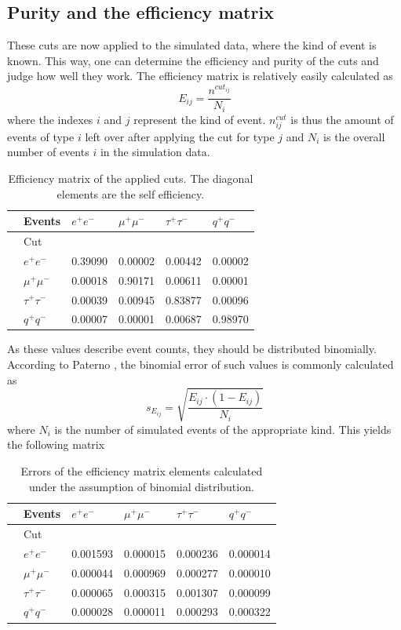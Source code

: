 \subsection{Purity and the efficiency matrix}
These cuts are now applied to the simulated data, where the kind of event is known. This way, one can determine the efficiency and purity of the cuts and judge how well they work. 
The efficiency matrix is relatively easily calculated as
\begin{equation}
E_{ij}=\frac{n^{cut_{ij}}}{N_i}
\end{equation}
where the indexes $i$ and $j$ represent the kind of event. $n^{cut}_{ij}$ is thus the amount of events of type $i$ left over after applying the cut for type $j$ and $N_i$ is the overall number of events $i$ in the simulation data.
\begin{table}[H]\centering
	\begin{tabular}{@{}llllll@{}}
		\toprule
		&Events &$e^+e^-$&$\mu^+\mu^-$&$\tau^+\tau^-$&$q^+q^-$\\
		\midrule
		&Cut&&&&\\
		&$e^+e^-$&0.39090&0.00002&0.00442&0.00002\\
		&$\mu^+\mu^-$&0.00018&0.90171&0.00611&0.00001\\
		&$\tau^+\tau^-$&0.00039&0.00945&0.83877&0.00096\\
		&$q^+q^-$&0.00007&0.00001&0.00687&0.98970\\
	\end{tabular}
	\caption[Efficiency matrix]{Efficiency matrix of the applied cuts. The diagonal elements are the self efficiency.}
	\label{tb:efficiency}
\end{table}

As these values describe event counts, they should be distributed binomially. According to Paterno \cite{binpaper}, the binomial error of such values is commonly calculated as
\begin{equation}
s_{E_{ij}}=\sqrt{\frac{E_{ij}\cdot(1-E_{ij})}{N_i}}
\end{equation}
where $N_i$ is the number of simulated events of the appropriate kind. This yields the following matrix

\begin{table}[H]\centering
	\begin{tabular}{@{}llllll@{}}
		\toprule
		&Events &$e^+e^-$&$\mu^+\mu^-$&$\tau^+\tau^-$&$q^+q^-$\\
		\midrule
		&Cut&&&&\\
		&$e^+e^-$&0.001593&0.000015&0.000236&0.000014\\
		&$\mu^+\mu^-$&0.000044&0.000969&0.000277&0.000010\\
		&$\tau^+\tau^-$&0.000065&0.000315&0.001307&0.000099\\
		&$q^+q^-$&0.000028&0.000011&0.000293&0.000322\\
		\bottomrule
	\end{tabular}
	\caption[Efficiency error matrix]{Errors of the efficiency matrix elements calculated under the assumption of binomial distribution.}
	\label{tb:efficiencyerr}
\end{table}

